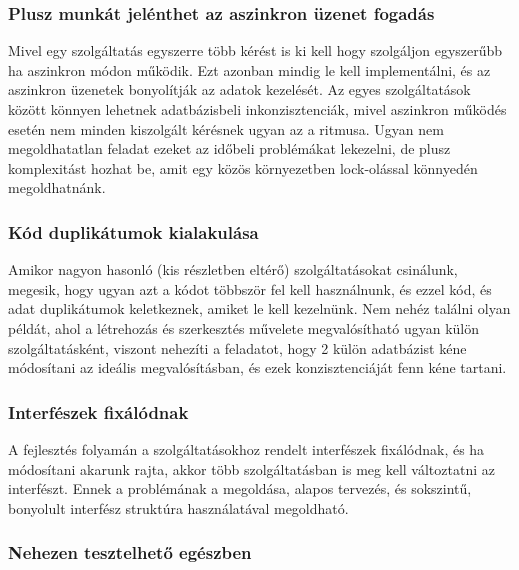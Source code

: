 \documentclass[11pt,magyar,a4paper,twoside,]{report}
\begin{document}
\subsubsection{Plusz munkát jelénthet az aszinkron üzenet
fogadás}\label{plusz-munkuxe1t-jeluxe9nthet-az-aszinkron-uxfczenet-fogaduxe1s}

Mivel egy szolgáltatás egyszerre több kérést is ki kell hogy szolgáljon
egyszerűbb ha aszinkron módon működik. Ezt azonban mindig le kell
implementálni, és az aszinkron üzenetek bonyolítják az adatok kezelését.
Az egyes szolgáltatások között könnyen lehetnek adatbázisbeli
inkonzisztenciák, mivel aszinkron működés esetén nem minden kiszolgált
kérésnek ugyan az a ritmusa. Ugyan nem megoldhatatlan feladat ezeket az
időbeli problémákat lekezelni, de plusz komplexitást hozhat be, amit egy
közös környezetben lock-olással könnyedén megoldhatnánk.

\subsubsection{Kód duplikátumok
kialakulása}\label{kuxf3d-duplikuxe1tumok-kialakuluxe1sa}

Amikor nagyon hasonló (kis részletben eltérő) szolgáltatásokat
csinálunk, megesik, hogy ugyan azt a kódot többször fel kell
használnunk, és ezzel kód, és adat duplikátumok keletkeznek, amiket le
kell kezelnünk. Nem nehéz találni olyan példát, ahol a létrehozás és
szerkesztés művelete megvalósítható ugyan külön szolgáltatásként,
viszont nehezíti a feladatot, hogy 2 külön adatbázist kéne módosítani az
ideális megvalósításban, és ezek konzisztenciáját fenn kéne tartani.

\subsubsection{Interfészek
fixálódnak}\label{interfuxe9szek-fixuxe1luxf3dnak}

A fejlesztés folyamán a szolgáltatásokhoz rendelt interfészek
fixálódnak, és ha módosítani akarunk rajta, akkor több szolgáltatásban
is meg kell változtatni az interfészt. Ennek a problémának a megoldása,
alapos tervezés, és sokszintű, bonyolult interfész struktúra
használatával megoldható.

\subsubsection{Nehezen tesztelhető
egészben}\label{nehezen-tesztelhetux151-eguxe9szben}
\end{document}
